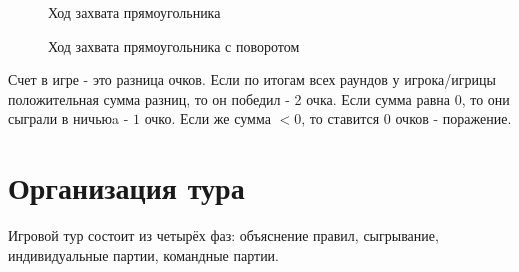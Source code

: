 \documentclass[11pt]{article} %
\begin{document}
\begin{figure}[h!]
\begin{minipage}{0.5\textwidth}
    \caption{Ход захвата прямоугольника}
\end{minipage}
\begin{minipage}{0.5\textwidth}
    \caption{Ход захвата прямоугольника с поворотом}
\end{minipage}
\end{figure}

Счет в игре - это разница очков. Если по итогам всех раундов у игрока/игрицы положительная сумма разниц, то он победил - 2 очка. Если сумма равна $0$, то они сыграли в ничьюa - $1$ очко. Если же сумма $<0$, то ставится $0$ очков - поражение.

\newpage
\section*{Организация тура}

Игровой тур состоит из четырёх фаз: объяснение правил, сыгрывание, индивидуальные партии, командные партии.
\end{document}
